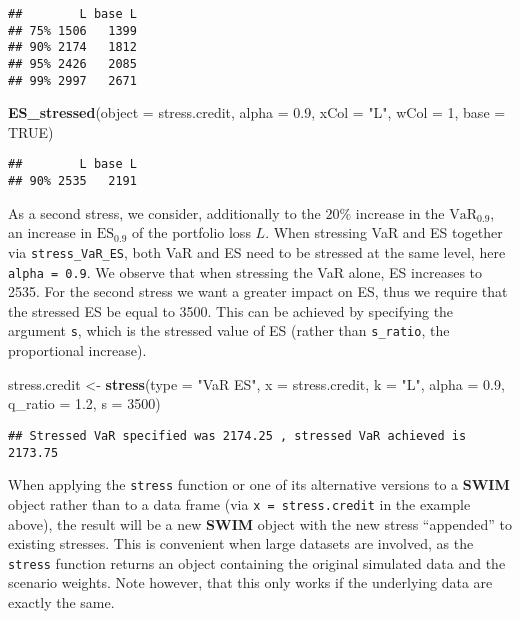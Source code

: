 \documentclass[
]{article}
\newenvironment{Shaded}{\begin{snugshade}}{\end{snugshade}}
\newcommand{\DataTypeTok}[1]{\textcolor[rgb]{0.13,0.29,0.53}{#1}}
\newcommand{\DecValTok}[1]{\textcolor[rgb]{0.00,0.00,0.81}{#1}}
\newcommand{\FloatTok}[1]{\textcolor[rgb]{0.00,0.00,0.81}{#1}}
\newcommand{\KeywordTok}[1]{\textcolor[rgb]{0.13,0.29,0.53}{\textbf{#1}}}
\newcommand{\NormalTok}[1]{#1}
\newcommand{\OtherTok}[1]{\textcolor[rgb]{0.56,0.35,0.01}{#1}}
\newcommand{\StringTok}[1]{\textcolor[rgb]{0.31,0.60,0.02}{#1}}
\begin{document}
\begin{verbatim}
##        L base L
## 75% 1506   1399
## 90% 2174   1812
## 95% 2426   2085
## 99% 2997   2671
\end{verbatim}

\begin{Shaded}
\begin{Highlighting}[]
\KeywordTok{ES_stressed}\NormalTok{(}\DataTypeTok{object =}\NormalTok{ stress.credit, }\DataTypeTok{alpha =} \FloatTok{0.9}\NormalTok{, }\DataTypeTok{xCol =} \StringTok{"L"}\NormalTok{, }\DataTypeTok{wCol =} \DecValTok{1}\NormalTok{, }
    \DataTypeTok{base =} \OtherTok{TRUE}\NormalTok{)}
\end{Highlighting}
\end{Shaded}

\begin{verbatim}
##        L base L
## 90% 2535   2191
\end{verbatim}

As a second stress, we consider, additionally to the \(20\%\) increase in the \(\text{VaR}_{0.9}\), an increase in \(\text{ES}_{0.9}\) of the portfolio loss \(L\). When stressing VaR and ES together via \texttt{stress\_VaR\_ES}, both VaR and ES need to be stressed at the same level, here \texttt{alpha\ =\ 0.9}. We observe that when stressing the VaR alone, ES increases to 2535. For the second stress we want a greater impact on ES, thus we require that the stressed ES be equal to 3500. This can be achieved by specifying the argument \texttt{s}, which is the stressed value of ES (rather than \texttt{s\_ratio}, the proportional increase).

\begin{Shaded}
\begin{Highlighting}[]
\NormalTok{stress.credit <-}\StringTok{ }\KeywordTok{stress}\NormalTok{(}\DataTypeTok{type =} \StringTok{"VaR ES"}\NormalTok{, }\DataTypeTok{x =}\NormalTok{ stress.credit, }\DataTypeTok{k =} \StringTok{"L"}\NormalTok{, }\DataTypeTok{alpha =} \FloatTok{0.9}\NormalTok{, }
    \DataTypeTok{q_ratio =} \FloatTok{1.2}\NormalTok{, }\DataTypeTok{s =} \DecValTok{3500}\NormalTok{)}
\end{Highlighting}
\end{Shaded}

\begin{verbatim}
## Stressed VaR specified was 2174.25 , stressed VaR achieved is 2173.75
\end{verbatim}

When applying the \texttt{stress} function or one of its alternative versions to a \textbf{SWIM} object rather than to a data frame (via \texttt{x\ =\ stress.credit} in the example above), the result will be a new \textbf{SWIM} object with the new stress ``appended'' to existing stresses. This is convenient when large datasets are involved, as the \texttt{stress} function returns an object containing the original simulated data and the scenario weights. Note however, that this only works if the underlying data are exactly the same.
\end{document}
